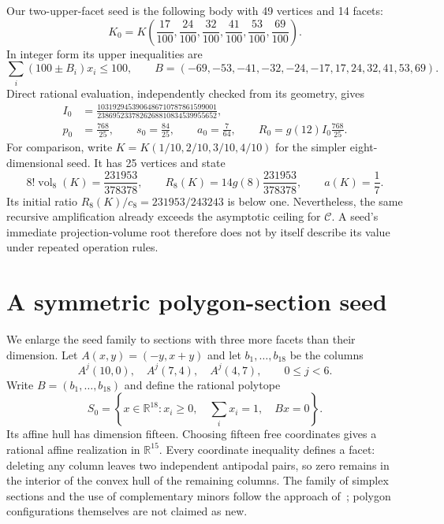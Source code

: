 \documentclass[11pt]{article}
\DeclareMathOperator{\vol}{vol}
\newcommand{\R}{\mathbb R}
\newcommand{\CC}{\mathcal C}
\begin{document}
Our two-upper-facet seed is the following body with 49 vertices and 14 facets:
\begin{equation}\label{eq:seed12}
 K_0=K\left(\frac{17}{100},\frac{24}{100},\frac{32}{100},
                    \frac{41}{100},\frac{53}{100},\frac{69}{100}\right).
\end{equation}
In integer form its upper inequalities are
\[
 \sum_i(100\pm B_i)x_i\le100,\qquad
 B=(-69,-53,-41,-32,-24,-17,17,24,32,41,53,69).
\]
Direct rational evaluation, independently checked from its geometry,
gives
\begin{align}
 I_0&=\frac{1031929453906486710787861599001}
               {2386952337826268810834539955652},\label{eq:exactI}\\
 p_0&=\frac{768}{25},\qquad s_0=\frac{84}{25},\qquad
 a_0=\frac7{64},\qquad R_0=g(12)I_0\frac{768}{25}.\label{eq:exactstate}
\end{align}
For comparison, write $K=K(1/10,2/10,3/10,4/10)$ for the simpler
eight-dimensional seed. It has 25 vertices and state
\[
 8!\vol_8(K)=\frac{231953}{378378},\qquad
 R_8(K)=14g(8)\frac{231953}{378378},\qquad a(K)=\frac17.
\]
Its initial ratio $R_8(K)/c_8=231953/243243$ is below one. Nevertheless,
the same recursive amplification already exceeds the asymptotic ceiling
for $\CC$. A seed's immediate projection-volume root therefore does not
by itself describe its value under repeated operation rules.

\section{A symmetric polygon-section seed}\label{sec:polygon}
We enlarge the seed family to sections with three more facets than their
dimension. Let $A(x,y)=(-y,x+y)$ and let $b_1,\ldots,b_{18}$ be
the columns
\[
 A^j(10,0),\quad A^j(7,4),\quad A^j(4,7),\qquad 0\le j<6.
\]
Write $B=(b_1,\ldots,b_{18})$ and define the rational polytope
\begin{equation}\label{eq:polygon-seed}
 S_0=\left\{x\in\R^{18}:x_i\ge0,\quad
                    \sum_i x_i=1,\quad Bx=0\right\}.
\end{equation}
Its affine hull has dimension fifteen. Choosing fifteen free coordinates
gives a rational affine realization in $\R^{15}$. Every coordinate
inequality defines a facet: deleting any column leaves two independent
antipodal pairs, so zero remains in the interior of the convex hull of
the remaining columns. The family of simplex sections and the use of
complementary minors follow the approach of~\cite[Section 4]{feng};
polygon configurations themselves are not claimed as new.
\end{document}
